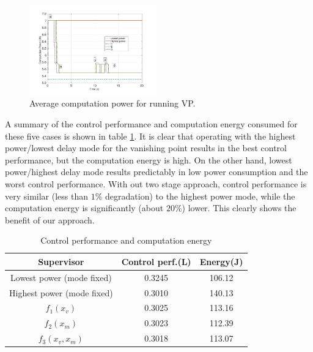 \begin{figure}[t]
\centering
\includegraphics[width=0.49\textwidth]{../simulations/figs/power.pdf}
\vspace{-20pt}
\caption{Average computation power for running VP.}
\label{fig:power} 
\end{figure}

A summary of the control performance and computation energy consumed for these five cases is shown in table \ref{tbl:performance}. It is clear that operating with the highest power/lowest delay mode for the vanishing point results in the best control performance, but the computation energy is high. On the other hand, lowest power/highest delay mode results predictably in low power consumption and the worst control performance. With out two stage approach, control performance is very similar (less than $1\%$ degradation) to the highest power mode, while the computation energy is significantly (about $20\%$) lower. This clearly shows the benefit of our approach.

\begin{table}[htb]
\begin{center}
\caption{Control performance and computation energy}
\label{tbl:performance}
\begin{tabular} {|c|c|c|}
	\hline
	\textbf{Supervisor} & \textbf{Control perf.}(L) & \textbf{Energy}(J) \\ \hline
	Lowest power (mode fixed) & 0.3245 & 106.12  \\ \hline
	Highest power (mode fixed) & 0.3010 & 140.13  \\ \hline
	 $f_1(x_v)$ & 0.3025 & 113.16  \\ \hline
	 $f_2(x_m)$ & 0.3023 & 112.39 \\ \hline
	 $f_3(x_v,x_m)$ & 0.3018 & 113.07 \\ \hline
	 
\end{tabular}
	\vspace{-10pt}	
	\end{center}
\end{table}



